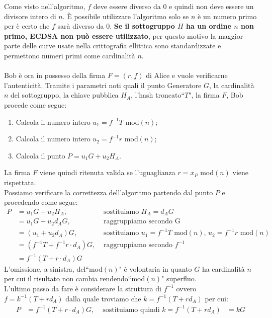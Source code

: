 \documentclass[a4paper,12pt]{tesiinfo}
\begin{document}
Come visto nell'algoritmo, $f$ deve essere diverso da $0$ e quindi non deve essere un divisore intero di $n$. \`E possibile utilizzare l'algoritmo solo se $n$ \`e un numero primo per \`e certo che $f$ sar\`a diverso da $0$. \textbf{Se il sottogruppo $H$ ha un ordine $n$ non primo, ECDSA non pu\`o essere utilizzato}, per questo motivo la maggior parte delle curve usate nella crittografia ellittica sono standardizzate e permettono numeri primi come cardinalit\`a $n$.
\\
\\
Bob \`e ora in possesso della firma $F = (r, f)$ di Alice e vuole verificarne l'autenticit\`a. Tramite i parametri noti quali il punto Generatore $G$, la cardinalit\`a $n$ del sottogruppo, la chiave pubblica $H_A$, l'hash troncato``$T$", la firma $F$, Bob procede come segue:
\begin{enumerate}
    \item Calcola il numero intero $u_1 = f^{-1}T$ mod$(n)$;
    \item Calcola il numero intero $u_2 = f^{-1}r$ mod$(n)$;
    \item Calcola il punto $P = u_1G + u_2H_A$.
\end{enumerate}
La firma $F$ viene quindi ritenuta valida se l'uguaglianza $r = x_P $ mod$(n)$ viene rispettata.
\\
Possiamo verificare la correttezza dell'algoritmo partendo dal punto $P$ e procedendo come segue:
\begin{align*}
    P &= u_1G + u_2H_A, &\text{ sostituiamo } H_A = d_AG\\
    &= u_1G + u_2d_AG, &\text{ raggruppiamo secondo G }\\
    &= (u_1 + u_2d_A)G, &\text{ sostituiamo } u_1 = f^{-1}T \text{ mod$(n)$, } u_2 = f^{-1}r\text{ mod$(n)$}\\
    &= (f^{-1}T + f^{-1}r \cdot d_A)G, &\text{ raggruppiamo secondo } f^{-1}\\
    &= f^{-1}(T + r \cdot d_A)G
\end{align*}
L'omissione, a sinistra, del``mod$(n)$" \`e volontaria in quanto $G$ ha cardinalit\`a $n$ per cui il risultato non cambia rendendo``mod$(n)$" superfluo.
\\
L'ultimo passo da fare \`e considerare la struttura di $f^{-1}$ ovvero $f = k^{-1} (T+rd_A)$ dalla quale troviamo che $k = f^{-1} (T+rd_A)$ per cui:
\begin{align*}
    P &= f^{-1}(T + r \cdot d_A)G, &\text{ sostituiamo quindi } k = f^{-1} (T+rd_A)
    &= kG
\end{align*}
\end{document}
